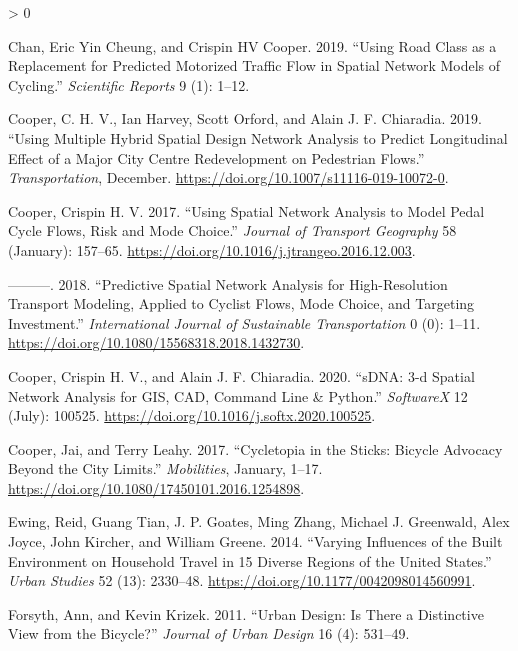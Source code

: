 \documentclass[galley]{jtlu-article-2col}
\newlength{\cslhangindent}
\newenvironment{CSLReferences}[2] %
 {%
  \setlength{\parindent}{0pt}
  \ifodd #1 \everypar{\setlength{\hangindent}{\cslhangindent}}\ignorespaces\fi
  \ifnum #2 > 0
  \setlength{\parskip}{#2\baselineskip}
  \fi
 }%
 {}
\begin{document}
\begin{CSLReferences}{1}{0}
\leavevmode\hypertarget{ref-chan_using_2019}{}%
Chan, Eric Yin Cheung, and Crispin HV Cooper. 2019. {``Using Road Class as a Replacement for Predicted Motorized Traffic Flow in Spatial Network Models of Cycling.''} \emph{Scientific Reports} 9 (1): 1--12.

\leavevmode\hypertarget{ref-cooper_using_2019}{}%
Cooper, C. H. V., Ian Harvey, Scott Orford, and Alain J. F. Chiaradia. 2019. {``Using Multiple Hybrid Spatial Design Network Analysis to Predict Longitudinal Effect of a Major City Centre Redevelopment on Pedestrian Flows.''} \emph{Transportation}, December. \url{https://doi.org/10.1007/s11116-019-10072-0}.

\leavevmode\hypertarget{ref-cooper_using_2017}{}%
Cooper, Crispin H. V. 2017. {``Using Spatial Network Analysis to Model Pedal Cycle Flows, Risk and Mode Choice.''} \emph{Journal of Transport Geography} 58 (January): 157--65. \url{https://doi.org/10.1016/j.jtrangeo.2016.12.003}.

\leavevmode\hypertarget{ref-cooper_predictive_2018}{}%
---------. 2018. {``Predictive Spatial Network Analysis for High-Resolution Transport Modeling, Applied to Cyclist Flows, Mode Choice, and Targeting Investment.''} \emph{International Journal of Sustainable Transportation} 0 (0): 1--11. \url{https://doi.org/10.1080/15568318.2018.1432730}.

\leavevmode\hypertarget{ref-cooper_sdna_2020}{}%
Cooper, Crispin H. V., and Alain J. F. Chiaradia. 2020. {``{sDNA}: 3-d Spatial Network Analysis for {GIS}, {CAD}, {Command Line} \& {Python}.''} \emph{SoftwareX} 12 (July): 100525. \url{https://doi.org/10.1016/j.softx.2020.100525}.

\leavevmode\hypertarget{ref-cooper_cycletopia_2017}{}%
Cooper, Jai, and Terry Leahy. 2017. {``Cycletopia in the Sticks: Bicycle Advocacy Beyond the City Limits.''} \emph{Mobilities}, January, 1--17. \url{https://doi.org/10.1080/17450101.2016.1254898}.

\leavevmode\hypertarget{ref-ewing_varying_2014}{}%
Ewing, Reid, Guang Tian, J. P. Goates, Ming Zhang, Michael J. Greenwald, Alex Joyce, John Kircher, and William Greene. 2014. {``Varying Influences of the Built Environment on Household Travel in 15 Diverse Regions of the {United States}.''} \emph{Urban Studies} 52 (13): 2330--48. \url{https://doi.org/10.1177/0042098014560991}.

\leavevmode\hypertarget{ref-forsyth_urban_2011}{}%
Forsyth, Ann, and Kevin Krizek. 2011. {``Urban Design: Is There a Distinctive View from the Bicycle?''} \emph{Journal of Urban Design} 16 (4): 531--49.


\end{CSLReferences}
\end{document}
